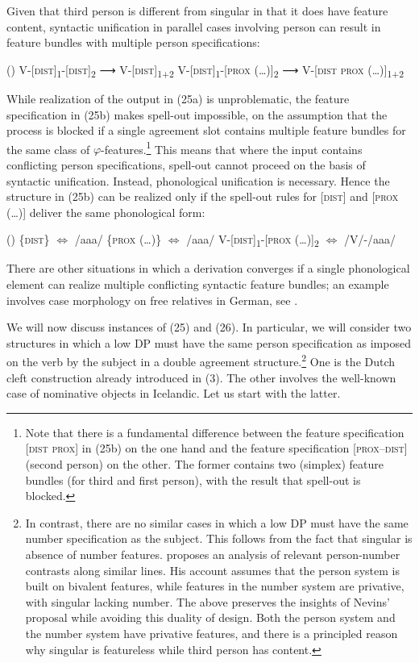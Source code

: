 \documentclass[output=paper]{langsci/langscibook}
\begin{document}
Given that third person is different from singular in that it does have feature content, syntactic unification in parallel cases involving person can result in feature bundles with multiple person specifications:

\ea (\label{bkm:Ref328733186}\label{bkm:Ref295571842}\label{bkm:Ref295397399}\label{bkm:Ref298060525})
\ea V-[\textsc{dist}]\textsubscript{1}{}-[\textsc{dist}]\textsubscript{2} ⟶ V-[\textsc{dist}]\textsubscript{1+2}
\ex V-[\textsc{dist}]\textsubscript{1}{}-[\textsc{prox} (…)]\textsubscript{2} ⟶ V-[\textsc{dist prox} (…)]\textsubscript{1+2}
\z
\z

While realization of the output in (25a) is unproblematic, the feature specification in (25b) makes spell-out impossible, on the assumption that the process is blocked if a single agreement slot contains multiple feature bundles for the same class of $\varphi $-features.\footnote{Note that there is a fundamental difference between the feature specification [\textsc{dist prox}] in (25b) on the one hand and the feature specification [\textsc{prox–dist}] (second person) on the other. The former contains two (simplex) feature bundles (for third and first person), with the result that spell-out is blocked.} This means that where the input contains conflicting person specifications, spell-out cannot proceed on the basis of syntactic unification. Instead, phonological unification is necessary. Hence the structure in (25b) can be realized only if the spell-out rules for [\textsc{dist}] and [\textsc{prox} (…)] deliver the same phonological form:

\ea (\label{bkm:Ref295480264})  
\ea  \{\textsc{dist}\} $\Leftrightarrow$ /aaa/
\ex  \{\textsc{prox} (…)\} $\Leftrightarrow$ /aaa/
\ex V-[\textsc{dist}]\textsubscript{1}{}-[\textsc{prox} (…)]\textsubscript{2} $\Leftrightarrow$ /V/-/aaa/
\z \z

There are other situations in which a derivation converges if a single phonological element can realize multiple conflicting syntactic feature bundles; an example involves case morphology on free relatives in German, see \citealt{Groos1981}.

We will now discuss instances of (25) and (26). In particular, we will consider two structures in which a low DP must have the same person specification as imposed on the verb by the subject in a double agreement structure.\footnote{In contrast, there are no similar cases in which a low DP must have the same number specification as the subject. This follows from the fact that singular is absence of number features. \citet{Nevins2011} proposes an analysis of relevant person-number contrasts along similar lines. His account assumes that the person system is built on bivalent features, while features in the number system are privative, with singular lacking number. The above preserves the insights of Nevins’ proposal while avoiding this duality of design. Both the person system and the number system have privative features, and there is a principled reason why singular is featureless while third person has content.} One is the Dutch cleft construction already introduced in (3). The other involves the well-known case of nominative objects in Icelandic. Let us start with the latter.
\end{document}
